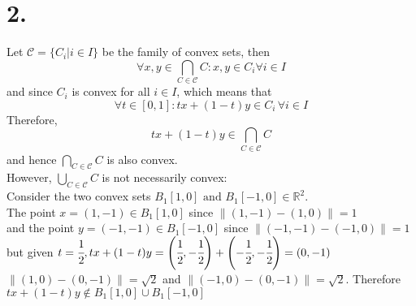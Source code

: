 \documentclass[11pt]{article}
\begin{document}
\section*{2.}
Let $\mathcal{C} = \{C_i | i \in I \}$ be the family of convex sets, then
\[\forall x,y \in \bigcap_{C \in \mathcal{C}} C: x,y \in C_i \forall i \in I\]
and since $C_i$ is convex for all $i \in I$, which means that
\[
\forall t \in [0,1]: tx + (1-t)y \in C_i \, \forall i \in I 
\]
Therefore, 
\[
tx+(1-t)y \in \bigcap_{C \in \mathcal{C}} C
\]
and hence $\bigcap_{C \in \mathcal{C}} C$ is also convex.\\
However, $\bigcup_{C \in \mathcal{C}} C$ is not necessarily convex: \\
Consider the two convex sets $B_1[1,0] \text{ and } B_1[-1,0] \in \mathbb{R}^2$. \\
The point $x = (1,-1) \in B_1[1,0]$ since $\| (1,-1) - (1,0)\| = 1$ \\
and the point $y = (-1,-1) \in B_1[-1,0]$ since $\| (-1,-1) - (-1,0)\| = 1$
but given $t= \cfrac{1}{2}, tx+(1-t)y = \left(\cfrac{1}{2}, -\cfrac{1}{2}\right) + \left(-\cfrac{1}{2}, -\cfrac{1}{2}\right)  = (0, -1)$ \\
$\|(1,0) - (0,-1)\| = \sqrt{2}$ and $\|(-1,0) - (0,-1)\| = \sqrt{2}$. Therefore $tx+(1-t)y \notin B_1[1,0] \cup B_1[-1,0]$
\pagebreak
\end{document}
